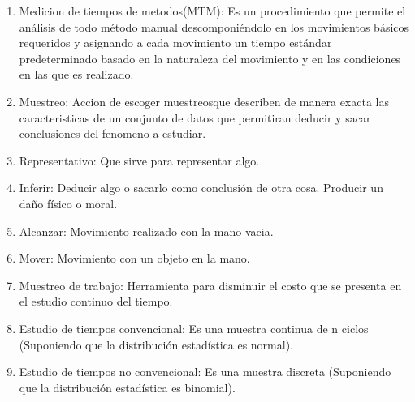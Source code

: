 \begin{enumerate}
    \cite{DiapositivasSema-2-21}
    \item Medicion de tiempos de metodos(MTM): Es un procedimiento que permite el análisis de todo método manual descomponiéndolo en los movimientos básicos requeridos y asignando a cada movimiento un tiempo estándar predeterminado basado en la naturaleza del movimiento y en las condiciones en las que es realizado.
    \item Muestreo: Accion de escoger muestreosque describen de manera exacta las caracteristicas de un conjunto de datos que permitiran deducir y sacar conclusiones del fenomeno a estudiar.
    \cite{DiapositivasSema-4-04}
    \item Representativo: Que sirve para representar algo.
    \cite{DiapositivasSema-4-04}
    \item Inferir:  Deducir algo o sacarlo como conclusión de otra cosa. Producir un daño físico o moral.
    \cite{asalerae2023}
    \item Alcanzar: Movimiento realizado con la mano vacia.
    \cite{asale_rae_2023}
    \item Mover: Movimiento con un objeto en la mano.
    \cite{DiapositivasSema-2-22}
    \item Muestreo de trabajo: Herramienta para disminuir el costo que se presenta en el estudio continuo del tiempo.
    \cite{DiapositivasSema-4-04}
    \item Estudio de tiempos convencional: Es una muestra continua de n ciclos (Suponiendo que la distribución estadística es normal).
    \cite{DiapositivasSema-4-04}
    \item Estudio de tiempos no convencional: Es una muestra discreta (Suponiendo que la distribución estadística es binomial).
    \cite{DiapositivasSema-4-04}
\end{enumerate}




